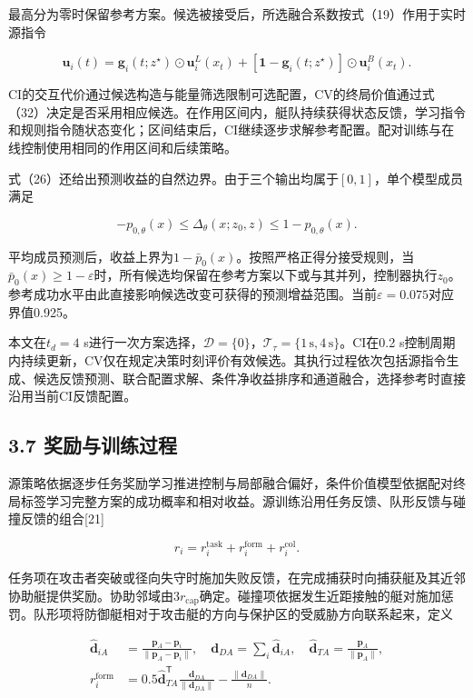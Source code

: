\documentclass[UTF8,a4paper,zihao=5,fontset=none]{ctexart}
\begin{document}
最高分为零时保留参考方案。候选被接受后，所选融合系数按式（19）作用于实时源指令

\[
\boldsymbol u_i(t)
=\boldsymbol g_i(t;z^\star)\odot\boldsymbol u_i^L(x_t)
+[\boldsymbol1-\boldsymbol g_i(t;z^\star)]\odot\boldsymbol u_i^B(x_t).
\tag{33}
\]

CI的交互代价通过候选构造与能量筛选限制可选配置，CV的终局价值通过式（32）决定是否采用相应候选。在作用区间内，艇队持续获得状态反馈，学习指令和规则指令随状态变化；区间结束后，CI继续逐步求解参考配置。配对训练与在线控制使用相同的作用区间和后续策略。

式（26）还给出预测收益的自然边界。由于三个输出均属于\([0,1]\)，单个模型成员满足

\[
-p_{0,\theta}(x)\leq\Delta_\theta(x;z_0,z)\leq1-p_{0,\theta}(x).
\tag{34}
\]

平均成员预测后，收益上界为\(1-\bar p_0(x)\)。按照严格正得分接受规则，当\(\bar p_0(x)\geq1-\varepsilon\)时，所有候选均保留在参考方案以下或与其并列，控制器执行\(z_0\)。参考成功水平由此直接影响候选改变可获得的预测增益范围。当前\(\varepsilon=0.075\)对应界值0.925。

本文在\(t_d=4\)
s进行一次方案选择，\(\mathcal D=\{0\}\)，\(\mathcal T_\tau=\{1\,\mathrm s,4\,\mathrm s\}\)。CI在0.2
s控制周期内持续更新，CV仅在规定决策时刻评价有效候选。其执行过程依次包括源指令生成、候选反馈预测、联合配置求解、条件净收益排序和通道融合，选择参考时直接沿用当前CI反馈配置。

\subsection*{3.7
奖励与训练过程}

源策略依据逐步任务奖励学习推进控制与局部融合偏好，条件价值模型依据配对终局标签学习完整方案的成功概率和相对收益。源训练沿用任务反馈、队形反馈与碰撞反馈的组合{[}21{]}

\[
r_i=r_i^{\mathrm{task}}+r_i^{\mathrm{form}}+r_i^{\mathrm{col}}.
\tag{35}
\]

任务项在攻击者突破或径向失守时施加失败反馈，在完成捕获时向捕获艇及其近邻协助艇提供奖励。协助邻域由\(3r_{\mathrm{cap}}\)确定。碰撞项依据发生近距接触的艇对施加惩罚。队形项将防御艇相对于攻击艇的方向与保护区的受威胁方向联系起来，定义

\[
\begin{aligned}
\widehat{\boldsymbol d}_{iA}
&=\frac{\boldsymbol p_A-\boldsymbol p_i}{\|\boldsymbol p_A-\boldsymbol p_i\|},
\quad
\boldsymbol d_{DA}=\sum_i\widehat{\boldsymbol d}_{iA},
\quad
\widehat{\boldsymbol d}_{TA}=\frac{\boldsymbol p_A}{\|\boldsymbol p_A\|},\\
r_i^{\mathrm{form}}
&=0.5\widehat{\boldsymbol d}_{TA}^{\mathsf T}
\frac{\boldsymbol d_{DA}}{\|\boldsymbol d_{DA}\|}
-\frac{\|\boldsymbol d_{DA}\|}{n}.
\end{aligned}
\tag{36}
\]
\end{document}
